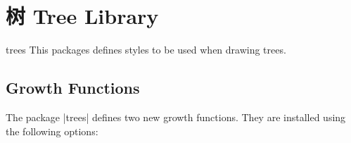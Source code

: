 %
%
%


\section{树 Tree Library}
\label{section-tree-library}

\begin{tikzlibrary}{trees}
    This packages defines styles to be used when drawing trees.
\end{tikzlibrary}


\subsection{Growth Functions}

The package |trees| defines two new growth functions. They are installed using
the following options:

